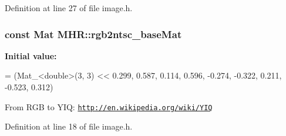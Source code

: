 Definition at line 27 of file image.\+h.

\hypertarget{namespace_m_h_r_a7191e886f0a618347db01d5743eb2856}{
\subsubsection[{rgb2ntsc\+\_\+base\+Mat}]{\setlength{\rightskip}{0pt plus 5cm}const Mat M\+H\+R\+::rgb2ntsc\+\_\+base\+Mat}}\label{namespace_m_h_r_a7191e886f0a618347db01d5743eb2856}
{\bfseries Initial value\+:}
\begin{DoxyCode}
= (Mat\_<double>(3, 3) <<
                                  0.299, 0.587, 0.114,
                                  0.596, -0.274, -0.322,
                                  0.211, -0.523, 0.312)
\end{DoxyCode}
From R\+G\+B to Y\+I\+Q\+:  \href{http://en.wikipedia.org/wiki/YIQ}{\tt http\+://en.\+wikipedia.\+org/wiki/\+Y\+I\+Q} 

Definition at line 18 of file image.\+h.

